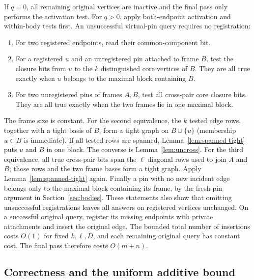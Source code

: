 \documentclass[11pt,a4paper]{article}
\theoremstyle{definition}
\theoremstyle{remark}
\begin{document}
If $q=0$, all remaining original vertices are inactive and the
final pass only performs the activation test. For $q>0$, apply
both-endpoint activation and within-body tests first.
An unsuccessful virtual-pin query requires no
registration:
\begin{enumerate}
 \item For two registered endpoints, read their
 common-component bit.
 \item For a registered $u$ and an unregistered
 pin attached to frame $B$, test the closure
 bits from $u$ to the $k$ distinguished core
 vertices of $B$. They are all true exactly
 when $u$ belongs to the maximal block
 containing $B$.
 \item For two unregistered pins of frames
 $A,B$, test all cross-pair core closure bits.
 They are all true exactly when the two
 frames lie in one maximal block.
\end{enumerate}
The frame size is constant.
For the second equivalence, the $k$ tested edge rows, together
with a tight basis of $B$, form a tight graph on $B\cup\{u\}$
(membership $u\in B$ is immediate). If all tested rows are
spanned, Lemma~\ref{lem:spanned-tight} puts $u$ and $B$ in one
block. The converse is Lemma~\ref{lem:uncross}.
For the third equivalence, all true cross-pair bits span the
$\ell$ diagonal rows used to join $A$ and $B$; those rows and
the two frame bases form a tight graph. Apply
Lemma~\ref{lem:spanned-tight} again. Finally a pin with no new
incident edge belongs only to the maximal block containing its
frame, by the fresh-pin argument in Section~\ref{sec:bodies}.
These statements also show that omitting unsuccessful
registrations leaves all answers on registered vertices unchanged.
On a successful original query, register its
missing endpoints with private attachments
and insert the original edge.
The bounded total number of insertions costs
$O(1)$ for fixed $k,\ell,D$, and each remaining
original query has constant cost.
The final pass therefore costs $O(m+n)$.

\subsection{Correctness and the uniform additive bound}
\end{document}
